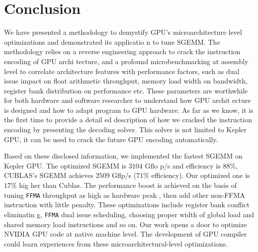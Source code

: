 \section{Conclusion}
\label{sec:conclusion}
We have presented a methodology to demystify GPU's microarchitecture level optimizations and demonstrated its applicatio
n to tune SGEMM. The methodology relies on a reverse engineering approach to crack the instruction encoding of GPU archi
tecture, and a profound microbenchmarking at assembly level to correlate architecture features with performance factors,
 such as dual issue impact on float arithmetic throughput, memory load width on bandwidth, register bank distribution on
 performance etc. These parameters are worthwhile for both hardware and software researcher to understand how GPU archit
ecture is designed and how to adapt program to GPU hardware. As far as we know, it is the first time to provide a detail
ed description of how we cracked the instruction encoding by presenting the decoding solver. This solver is not limited 
to Kepler GPU, it can be used to crack the future GPU encoding automatically.

Based on these disclosed information, we implemented the fastest SGEMM on Kepler GPU. The optimized SGEMM is $3104$ Gflo
p/s and efficiency is $88\%$, CUBLAS's SGEMM achieves $2509$ Gflp/s ($71\%$ efficiency). Our optimized one is $17\%$ hig
her than Cublas. The performance boost is achieved on the basis of tuning {\tt FFMA} throughput as high as hardware peak
, then add other non-FFMA instruction with little penalty. These optimizations include register bank conflict eliminatin
g, {\tt FFMA} dual issue scheduling, choosing proper width of global load and shared memory load instructions and so on.
 Our work opens a door to optimize NVIDIA GPU code at native machine level. The development of GPU compiler could learn 
experiences from these microarchitectural-level optimizations.


